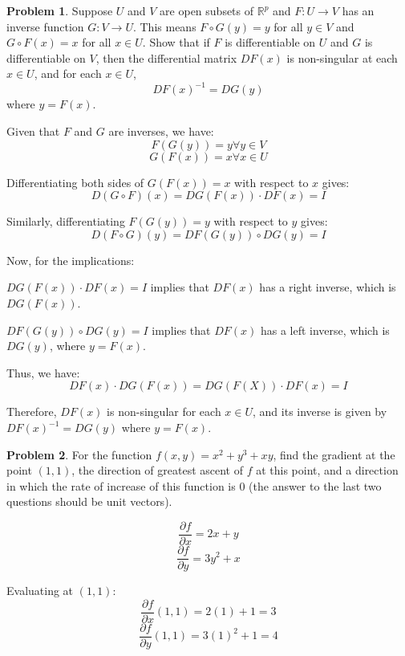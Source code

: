 \documentclass[12]{amsart}
\theoremstyle{definition}
\newtheorem{xca}{Problem}
\newcommand{\R}{\mathbb{R}}
\newcommand{\sskip}{\newpage%
}
\begin{document}
\sskip


\begin{xca} %

\bigskip

Suppose $U$ and $V$ are open subsets of $\R^p$ and $F:U\to V$ has an inverse function $G:V\to U$. This means $F\circ G(y)=y$ for all $y\in V$
and $G\circ F(x)=x$ for all $x\in U$. Show that if $F$ is differentiable on $U$ and $G$ is differentiable on $V$, then the differential matrix $DF(x)$ is non-singular at each $x\in U$, and for each $x\in U$,
$$
DF(x)^{-1}=DG(y)
$$
where $y=F(x)$.

\end{xca}


Given that $F$ and $G$ are inverses, we have:
\[F(G(y)) = y \forall y \in V\]
\[G(F(x)) = x \forall x \in U\]

Differentiating both sides of $G(F(x)) = x$ with respect to $x$ gives:
\[D(G \circ F)(x) = D G(F(x)) \cdot D F(x) = I\]

Similarly, differentiating $F(G(y)) = y$ with respect to $y$ gives:
\[D(F \circ G)(y) = D F(G(y)) \circ D G(y) = I\]


Now, for the implications:

$D G(F(x)) \cdot D F(x) = I$ implies that $D F(x)$ has a right inverse,
which is $D G(F(x))$.

$D F(G(y)) \circ D G(y) = I$ implies that $D F(x)$ has a left inverse,
which is $D G(y)$, where $y = F(x)$.


Thus, we have:
\[D F(x) \cdot D G(F(x)) = D G(F(X)) \cdot D F(x) = I\]


Therefore, $D F(x)$ is non-singular for each $x \in U$, and its inverse
is given by $D F(x)^{-1} =  D G(y)$ where $y = F(x)$.


\sskip



\begin{xca} %

\bigskip

For the function $f(x,y)=x^2+y^3+xy$, find the gradient at the point $(1,1)$, the direction of greatest ascent of $f$ at this point, and a direction in which the rate of increase of this function is $0$ (the answer to the last two questions should be unit vectors).


\end{xca}


\[\frac{\partial f}{\partial x} = 2x + y\]
\[\frac{\partial f}{\partial y} = 3y^2 + x\]

Evaluating at $(1,1)$:
\[\frac{\partial f}{\partial x}(1, 1) = 2(1) + 1 = 3\]
\[\frac{\partial f}{\partial y}(1, 1) = 3(1)^2 + 1 = 4\]
\end{document}
